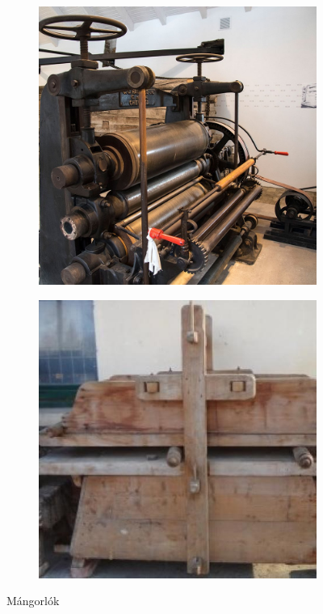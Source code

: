 \documentclass[fontsize=12pt, appendixprefix=true]{scrreprt}
\begin{document}
\begin{figure}[h!]
\begin{subfigure}[b]{0.3\linewidth}
	  \includegraphics[width=\linewidth]{img/20.jpg}
	  \caption{}
	\end{subfigure}
	\begin{subfigure}[b]{0.3\linewidth}
		\includegraphics[width=\linewidth]{img/28613.jpg}
		\caption{}
	  \end{subfigure}
	\caption{Mángorlók}
	\label{fig:mangorlo}
  \end{figure}
\end{document}
